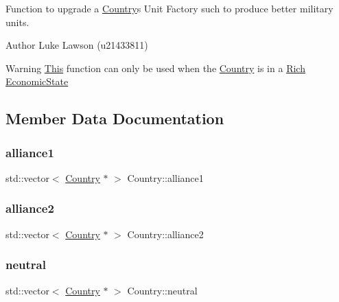Function to upgrade a \mbox{\hyperlink{class_country}{Country}}\textquotesingle{}s Unit Factory such to produce better military units. 

\begin{DoxyAuthor}{Author}
Luke Lawson (u21433811) 
\end{DoxyAuthor}
\begin{DoxyWarning}{Warning}
\mbox{\hyperlink{class_this}{This}} function can only be used when the \mbox{\hyperlink{class_country}{Country}} is in a \mbox{\hyperlink{class_rich}{Rich}} \mbox{\hyperlink{class_economic_state}{Economic\+State}} 
\end{DoxyWarning}


\subsection{Member Data Documentation}
\mbox{\label{class_country_aa31ffa895ce3842620c7a9b28078fa12}} 
\subsubsection{\texorpdfstring{alliance1}{alliance1}}
{\footnotesize\ttfamily std\+::vector$<$ \mbox{\hyperlink{class_country}{Country}} $\ast$ $>$ Country\+::alliance1\hspace{0.3cm}{\ttfamily [static]}}

\mbox{\label{class_country_a068359e92bc21f41aa6404d3d25d1d7a}} 
\subsubsection{\texorpdfstring{alliance2}{alliance2}}
{\footnotesize\ttfamily std\+::vector$<$ \mbox{\hyperlink{class_country}{Country}} $\ast$ $>$ Country\+::alliance2\hspace{0.3cm}{\ttfamily [static]}}

\mbox{\label{class_country_aa47868ab5f109c05a5f2d4be6df3f325}} 
\subsubsection{\texorpdfstring{neutral}{neutral}}
{\footnotesize\ttfamily std\+::vector$<$ \mbox{\hyperlink{class_country}{Country}} $\ast$ $>$ Country\+::neutral\hspace{0.3cm}{\ttfamily [static]}}

